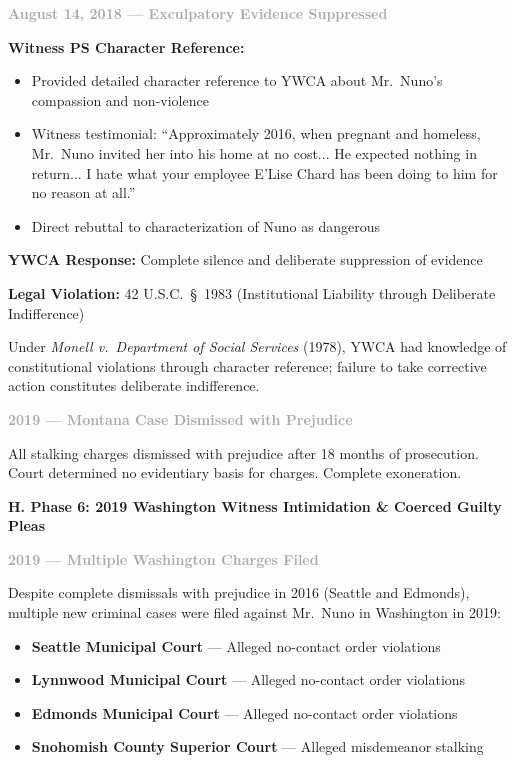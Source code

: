 \documentclass[11pt, letterpaper]{article}
\newcommand{\subsectiontitle}[1]{\vspace{0.15in}\noindent\textcolor{NavyBlue}{\textbf{#1}}\vspace{0.05in}}
\newcommand{\subsubsectiontitle}[1]{\vspace{0.1in}\noindent\textcolor{DarkGray}{\textbf{#1}}\vspace{0.05in}}
\begin{document}
\subsubsectiontitle{August 14, 2018 --- Exculpatory Evidence Suppressed}

\textbf{Witness PS Character Reference:}
\begin{itemize}[leftmargin=*,itemsep=2pt]
    \item Provided detailed character reference to YWCA about Mr.\ Nuno's compassion and non-violence
    \item Witness testimonial: ``Approximately 2016, when pregnant and homeless, Mr.\ Nuno invited her into his home at no cost... He expected nothing in return... I hate what your employee E'Lise Chard has been doing to him for no reason at all.''
    \item Direct rebuttal to characterization of Nuno as dangerous
\end{itemize}

\textbf{YWCA Response:} Complete silence and deliberate suppression of evidence

\textbf{Legal Violation:} 42 U.S.C.\ \S\ 1983 (Institutional Liability through Deliberate Indifference)

Under \textit{Monell v.\ Department of Social Services} (1978), YWCA had knowledge of constitutional violations through character reference; failure to take corrective action constitutes deliberate indifference.

\subsubsectiontitle{2019 --- Montana Case Dismissed with Prejudice}

All stalking charges dismissed with prejudice after 18 months of prosecution. Court determined no evidentiary basis for charges. Complete exoneration.

\subsectiontitle{H. Phase 6: 2019 Washington Witness Intimidation \& Coerced Guilty Pleas}

\subsubsectiontitle{2019 --- Multiple Washington Charges Filed}

Despite complete dismissals with prejudice in 2016 (Seattle and Edmonds), multiple new criminal cases were filed against Mr.\ Nuno in Washington in 2019:
\begin{itemize}[leftmargin=*,itemsep=2pt]
    \item \textbf{Seattle Municipal Court} --- Alleged no-contact order violations
    \item \textbf{Lynnwood Municipal Court} --- Alleged no-contact order violations
    \item \textbf{Edmonds Municipal Court} --- Alleged no-contact order violations
    \item \textbf{Snohomish County Superior Court} --- Alleged misdemeanor stalking
\end{itemize}
\end{document}
